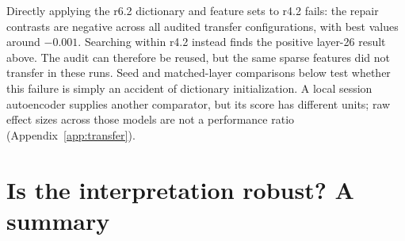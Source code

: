 \documentclass[10pt]{article} %
\begin{document}
Directly applying the r6.2 dictionary and feature sets to r4.2 fails:
the repair contrasts are negative across all audited transfer
configurations, with best values around $-0.001$. Searching within r4.2
instead finds the positive layer-26 result above. The audit can therefore
be reused, but the same sparse features did not transfer in these runs.
Seed and matched-layer comparisons below test whether this failure is
simply an accident of dictionary initialization. A local session
autoencoder supplies another comparator, but its score has different
units; raw effect sizes across those models are not a performance ratio
(Appendix~\ref{app:transfer}).

\section{Is the interpretation robust? A summary}
\label{sec:robustness}
\end{document}
